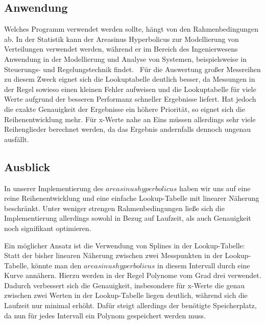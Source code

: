 \documentclass[course=erap] {aspdoc}
\begin{document}
 
     
     \subsection{Anwendung}
     Welches Programm verwendet werden sollte, hängt von den Rahmenbedingungen ab.
     In der Statistik kann der Areasinus Hyperbolicus zur Modellierung von Verteilungen verwendet werden, während er im Bereich des Ingenierwesens
     Anwendung in der Modellierung und Analyse von Systemen, beispielsweise in Steuerungs- und Regelungstechnik findet.~\cite{TODO}
     Für die Auswertung großer Messreihen zu diesem Zweck eignet sich die Lookuptabelle deutlich besser, da Messungen in der Regel sowieso einen kleinen Fehler aufweisen und die Lookuptabelle für viele Werte aufgrund der besseren Performanz schneller Ergebnisse liefert.
     Hat jedoch die exakte Genauigkeit der Ergebnisse ein höhere Priorität, so eignet sich die Reihenentwicklung mehr.
     Für x-Werte nahe an Eins müssen allerdings sehr viele Reihenglieder berechnet werden, da das Ergebnis andernfalls dennoch ungenau ausfällt.
 
     \subsection{Ausblick}
 
     In unserer Implementierung des $areasinus hyperbolicus$ haben wir uns auf eine reine Reihenentwicklung und eine einfache Lookup-Tabelle mit linearer Näherung beschränkt.
     Unter weniger strengen Rahmenbedingungen ließe sich die Implementierung allerdings sowohl in Bezug auf Laufzeit, als auch Genauigkeit noch signifikant optimieren. 
     
     Ein möglicher Ansatz ist die Verwendung von Splines in der Lookup-Tabelle: Statt der bisher linearen Näherung zwischen zwei Messpunkten in der Lookup-Tabelle, könnte man den $areasinus hyperbolicus$ in diesem Intervall durch eine Kurve annähern.
     Hierzu werden in der Regel Polynome vom Grad drei verwendet.
     Dadurch verbessert sich die Genauigkeit, insbesondere für x-Werte die genau zwischen zwei Werten in der Lookup-Tabelle liegen deutlich, während sich die Laufzeit nur minimal erhöht.
     Dafür steigt allerdings der benötigte Speicherplatz, da nun für jedes Intervall ein Polynom gespeichert werden muss.
 
\end{document}

